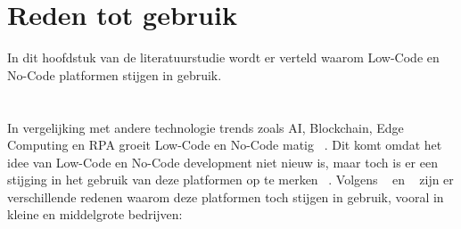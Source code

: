 \section{Reden tot gebruik}%
\label{sec:reden-tot-gebruik}
In dit hoofdstuk van de literatuurstudie wordt er verteld waarom Low-Code en No-Code platformen stijgen in gebruik.
\\
\\
\\
In vergelijking met andere technologie trends zoals AI, Blockchain, Edge Computing en RPA groeit Low-Code en No-Code matig ~\autocite{Kulkarni_2021}.
Dit komt omdat het idee van Low-Code en No-Code development niet nieuw is, maar toch is er een stijging in het gebruik van deze platformen op te merken ~\autocite{Elshan2023}.
Volgens ~\textcite{Elshan2023} en ~\textcite{Kulkarni_2021} zijn er verschillende redenen waarom deze platformen toch stijgen in gebruik, vooral in kleine en middelgrote bedrijven:
